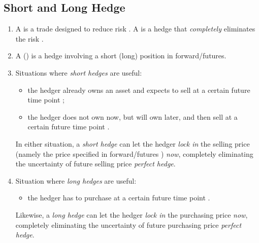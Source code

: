 \subsection{Short and Long Hedge}
\begin{enumerate}
\item A   is a trade designed to reduce risk . A
 is a hedge that \emph{completely} eliminates the risk
.
\item A  () is a hedge involving a short
(long) position in forward/futures.
\item Situations where \emph{short hedges} are useful:
\begin{itemize}
\item the hedger already owns an asset  and expects to sell
 at a certain future time point ;
\item the hedger does not own  now, but will own
 later, and then sell  at a certain future time
point .
\end{itemize}
In either situation, a \emph{short hedge} can let the hedger \emph{lock in}
 the selling price  (namely the price specified
in forward/futures ) \emph{now}, completely eliminating the
uncertainty of future selling price  \emph{perfect hedge}.

\item Situation where \emph{long hedges} are useful:
\begin{itemize}
\item the hedger has to purchase  at a certain future time
point .
\end{itemize}
Likewise, a \emph{long hedge} can let the hedger \emph{lock in}
 the purchasing price  \emph{now}, completely
eliminating the uncertainty of future purchasing price 
\emph{perfect hedge}.
\end{enumerate}

